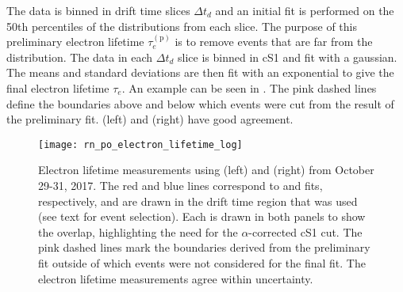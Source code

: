 The data is binned in drift time slices $\Delta t_d$ and an initial fit is performed on the 50th percentiles of the \stwob distributions
from each slice.  The purpose of this preliminary electron lifetime $\tau_e^{(\mathrm{p})}$ is to remove events that are far from the
distribution.  The data
in each $\Delta t_d$ slice is binned in cS1 and fit with a gaussian.  The means and standard deviations are then fit
with an exponential to give the final electron lifetime $\tau_e$.  An example can be seen in
.  The pink dashed lines define the boundaries above and below which
events were cut from the result of the preliminary fit.   (left) and  (right) have good agreement.

\begin{figure}
\centering
\texttt{[image: rn\_po\_electron\_lifetime\_log]}
\caption[Electron lifetime measurements using  (left) and  (right) from October 29-31, 2017.]{Electron lifetime
measurements using  (left) and  (right) from October 29-31, 2017.  The red and blue
lines correspond to  and  fits, respectively, and are drawn in the drift time region that was used (see
text for event selection).  Each is drawn in both panels to show the \stwob overlap, highlighting the need for the
$\alpha$-corrected cS1 cut.  The pink dashed lines mark the boundaries derived from the preliminary fit outside of which events were not
considered for the final fit.  The electron lifetime measurements agree within uncertainty.}
\label{fig:electron_lifetimes_measurement_alphas_elifetime}
\end{figure}

